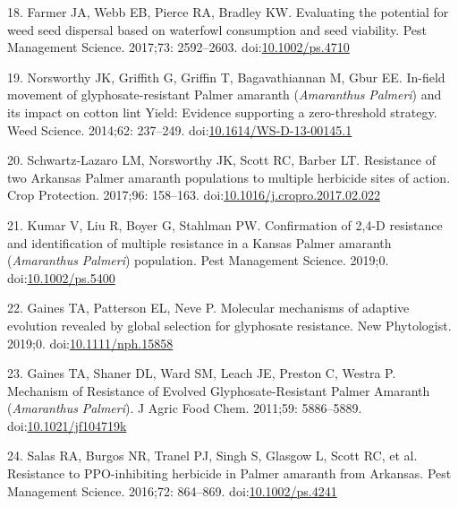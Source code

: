 \documentclass[10pt,letterpaper]{article}
\begin{document}
\leavevmode\hypertarget{ref-farmer_evaluating_2017}{}%
18. Farmer JA, Webb EB, Pierce RA, Bradley KW. Evaluating the potential
for weed seed dispersal based on waterfowl consumption and seed
viability. Pest Management Science. 2017;73: 2592--2603.
doi:\href{https://doi.org/10.1002/ps.4710}{10.1002/ps.4710}

\leavevmode\hypertarget{ref-norsworthy_-field_2014}{}%
19. Norsworthy JK, Griffith G, Griffin T, Bagavathiannan M, Gbur EE.
In-field movement of glyphosate-resistant Palmer amaranth
(\emph{Amaranthus} \emph{Palmeri}) and its impact on cotton lint Yield:
Evidence supporting a zero-threshold strategy. Weed Science. 2014;62:
237--249.
doi:\href{https://doi.org/10.1614/WS-D-13-00145.1}{10.1614/WS-D-13-00145.1}

\leavevmode\hypertarget{ref-schwartz-lazaro_resistance_2017}{}%
20. Schwartz-Lazaro LM, Norsworthy JK, Scott RC, Barber LT. Resistance
of two Arkansas Palmer amaranth populations to multiple herbicide sites
of action. Crop Protection. 2017;96: 158--163.
doi:\href{https://doi.org/10.1016/j.cropro.2017.02.022}{10.1016/j.cropro.2017.02.022}

\leavevmode\hypertarget{ref-kumar_confirmation_2019}{}%
21. Kumar V, Liu R, Boyer G, Stahlman PW. Confirmation of 2,4-D
resistance and identification of multiple resistance in a Kansas Palmer
amaranth (\emph{Amaranthus} \emph{Palmeri}) population. Pest Management
Science. 2019;0.
doi:\href{https://doi.org/10.1002/ps.5400}{10.1002/ps.5400}

\leavevmode\hypertarget{ref-gaines_molecular_2019}{}%
22. Gaines TA, Patterson EL, Neve P. Molecular mechanisms of adaptive
evolution revealed by global selection for glyphosate resistance. New
Phytologist. 2019;0.
doi:\href{https://doi.org/10.1111/nph.15858}{10.1111/nph.15858}

\leavevmode\hypertarget{ref-gaines_mechanism_2011}{}%
23. Gaines TA, Shaner DL, Ward SM, Leach JE, Preston C, Westra P.
Mechanism of Resistance of Evolved Glyphosate-Resistant Palmer Amaranth
(\emph{Amaranthus} \emph{Palmeri}). J Agric Food Chem. 2011;59:
5886--5889.
doi:\href{https://doi.org/10.1021/jf104719k}{10.1021/jf104719k}

\leavevmode\hypertarget{ref-salas_resistance_2016}{}%
24. Salas RA, Burgos NR, Tranel PJ, Singh S, Glasgow L, Scott RC, et al.
Resistance to PPO-inhibiting herbicide in Palmer amaranth from Arkansas.
Pest Management Science. 2016;72: 864--869.
doi:\href{https://doi.org/10.1002/ps.4241}{10.1002/ps.4241}
\end{document}
